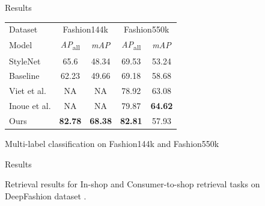 \documentclass[handout]{beamer}
\begin{document}
\begin{frame}{Results}
  \begin{table}
    \centering
    \begin{tabular}{ l c c c c}
       \hline
      Dataset & \multicolumn{2}{c}{Fashion144k \cite{SimoSerraCVPR2016}} & \multicolumn{2}{c}{Fashion550k \cite{InoueICCVW2017}} \\
      Model & \textit{AP}\textsubscript{all} & \textit{mAP} & \textit{AP}\textsubscript{all} & \textit{mAP} \\
      \hline
      StyleNet \cite{SimoSerraCVPR2016} & 65.6 & 48.34 & 69.53 & 53.24 \\
      Baseline \cite{InoueICCVW2017} & 62.23 & 49.66 & 69.18 & 58.68 \\
      Viet et al. \cite{veit2017learning} & NA & NA & 78.92 & 63.08 \\
      Inoue et al. \cite{InoueICCVW2017} & NA & NA & 79.87 & \textbf{64.62} \\
      Ours  & \textbf{82.78} & \textbf{68.38} & \textbf{82.81} & 57.93 \\
       \hline
    \end{tabular}
  \end{table}
  Multi-label classification on Fashion144k \cite{SimoSerraCVPR2016} and Fashion550k \cite{InoueICCVW2017}
\end{frame}

\begin{frame}{Results}
\vspace{-1cm}
\begin{center}
  \begin{figure}
    \centering
  \end{figure}
\end{center}
Retrieval results for In-shop and Consumer-to-shop retrieval tasks on DeepFashion dataset \cite{LiuCVPR2016}.
\end{frame}
\end{document}
